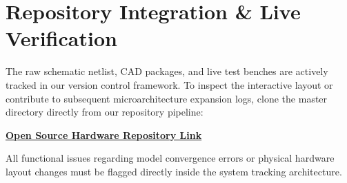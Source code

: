 \documentclass[11pt,letterpaper]{article}
\begin{document}
\section{Repository Integration \& Live Verification}
The raw schematic netlist, CAD packages, and live test benches are actively tracked in our version control framework. To inspect the interactive layout or contribute to subsequent microarchitecture expansion logs, clone the master directory directly from our repository pipeline:

\begin{center}
    \href{https://github.com/esgosar/4-bit-computer-from-scratch-with-transistors}{\textbf{Open Source Hardware Repository Link}}
\end{center}

All functional issues regarding model convergence errors or physical hardware layout changes must be flagged directly inside the system tracking architecture.
\end{document}
